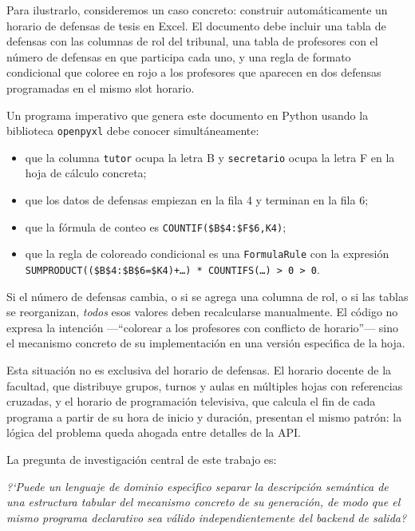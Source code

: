 Para ilustrarlo, consideremos un caso concreto: construir autom\'aticamente
un horario de defensas de tesis en Excel.  El documento debe incluir una
tabla de defensas con las columnas de rol del tribunal, una tabla de
profesores con el n\'umero de defensas en que participa cada uno, y una regla
de formato condicional que coloree en rojo a los profesores que aparecen en
dos defensas programadas en el mismo slot horario.

Un programa imperativo que genera este documento en Python usando la
biblioteca \texttt{openpyxl} debe conocer simult\'aneamente:
\begin{itemize}
  \item que la columna \texttt{tutor} ocupa la letra B y \texttt{secretario}
    ocupa la letra F en la hoja de c\'alculo concreta;
  \item que los datos de defensas empiezan en la fila 4 y terminan en la fila 6;
  \item que la f\'ormula de conteo es
    \texttt{COUNTIF(\$B\$4:\$F\$6,K4)};
  \item que la regla de coloreado condicional es una \texttt{FormulaRule}
    con la expresi\'on
    \texttt{SUMPRODUCT((\$B\$4:\$B\$6=\$K4)+\ldots) * COUNTIFS(\ldots) > 0 > 0}.
\end{itemize}

Si el n\'umero de defensas cambia, o si se agrega una columna de rol, o si
las tablas se reorganizan, \emph{todos} esos valores deben recalcularse
manualmente.  El c\'odigo no expresa la intenci\'on ---``colorear a los
profesores con conflicto de horario''--- sino el mecanismo concreto de su
implementaci\'on en una versi\'on espec\'{\i}fica de la hoja.

Esta situaci\'on no es exclusiva del horario de defensas.  El horario docente
de la facultad, que distribuye grupos, turnos y aulas en m\'ultiples hojas
con referencias cruzadas, y el horario de programaci\'on televisiva, que
calcula el fin de cada programa a partir de su hora de inicio y duraci\'on,
presentan el mismo patr\'on: la l\'ogica del problema queda ahogada entre
detalles de la API.

La pregunta de investigaci\'on central de este trabajo es:

\medskip
\begin{center}
\itshape
?`Puede un lenguaje de dominio espec\'{\i}fico separar la descripci\'on
sem\'antica de una estructura tabular del mecanismo concreto de su
generaci\'on, de modo que el mismo programa declarativo sea v\'alido
independientemente del backend de salida?
\end{center}
\medskip

